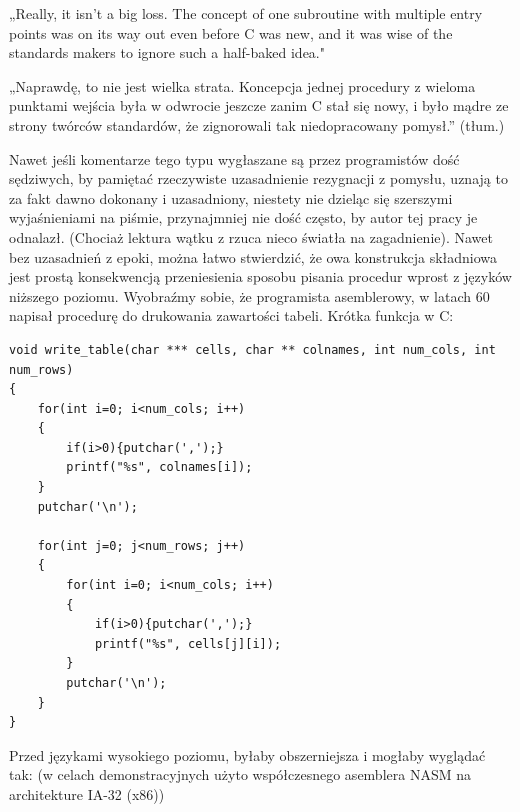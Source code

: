 „Really, it isn't a big loss. The concept of one subroutine with multiple entry points was on its way out even before C was new, and it was wise of the standards makers to ignore such a half-baked idea."\cite{delreth_on_entry}

„Naprawdę, to nie jest wielka strata. Koncepcja jednej procedury z wieloma punktami wejścia była w odwrocie jeszcze zanim C stał się nowy, i było mądre ze strony twórców standardów, że zignorowali tak niedopracowany pomysł.” (tłum.)
 
Nawet jeśli komentarze tego typu wygłaszane są przez programistów dość sędziwych, by pamiętać rzeczywiste uzasadnienie rezygnacji z pomysłu, uznają to za fakt dawno dokonany i uzasadniony, niestety nie dzieląc się szerszymi wyjaśnieniami na piśmie, przynajmniej nie dość często, by autor tej pracy je odnalazł. (Chociaż lektura wątku z \cite{delreth_on_entry} rzuca nieco światła na zagadnienie).
Nawet bez uzasadnień z epoki, można łatwo stwierdzić, że owa konstrukcja składniowa jest prostą konsekwencją przeniesienia sposobu pisania procedur wprost z języków niższego poziomu. Wyobraźmy sobie, że programista asemblerowy, w latach 60 napisał procedurę do drukowania zawartości tabeli. Krótka funkcja w C:

\begin{lstlisting}
void write_table(char *** cells, char ** colnames, int num_cols, int num_rows)
{
    for(int i=0; i<num_cols; i++)
    {
        if(i>0){putchar(',');}
        printf("%s", colnames[i]);
    }
    putchar('\n');
    
    for(int j=0; j<num_rows; j++)
    {
        for(int i=0; i<num_cols; i++)
        {
            if(i>0){putchar(',');}
            printf("%s", cells[j][i]);
        }
        putchar('\n');
    }
}
\end{lstlisting}

Przed językami wysokiego poziomu, byłaby obszerniejsza i mogłaby wyglądać tak:
(w celach demonstracyjnych użyto współczesnego asemblera NASM na architekture IA-32 (x86))

